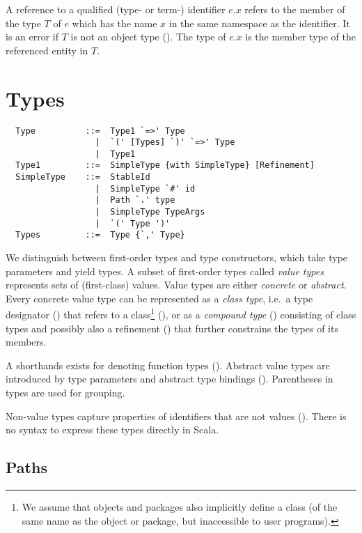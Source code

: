 \documentclass[a4paper,12pt,twoside,titlepage]{book}
\begin{document}
A reference to a qualified (type- or term-) identifier $e.x$ refers to
the member of the type $T$ of $e$ which has the name $x$ in the same
namespace as the identifier. It is an error if $T$ is not an object type
(). The type of $e.x$ is the member type of the
referenced entity in $T$.

\chapter{\label{sec:types}Types}

\syntax\begin{lstlisting}
  Type          ::=  Type1 `=>' Type
                  |  `(' [Types] `)' `=>' Type
                  |  Type1
  Type1         ::=  SimpleType {with SimpleType} [Refinement]
  SimpleType    ::=  StableId
                  |  SimpleType `#' id
                  |  Path `.' type
                  |  SimpleType TypeArgs
                  |  `(' Type ')'
  Types         ::=  Type {`,' Type}
\end{lstlisting}

We distinguish between first-order types and type constructors, which
take type parameters and yield types. A subset of first-order types
called {\em value types} represents sets of (first-class) values.
Value types are either {\em concrete} or {\em abstract}. Every
concrete value type can be represented as a {\em class type}, i.e.\ a
type designator () that refers to a 
class\footnote{We assume that objects and packages also
implicitly define a class (of the same name as the object or package,
but inaccessible to user programs).} (), 
or as a {\em compound type} () 
consisting of class types and possibly
also a refinement () that further constrains the
types of its members.

A shorthands exists for denoting function types
().  Abstract value types are introduced by
type parameters and abstract type bindings ().
Parentheses in types are used for grouping.

Non-value types capture properties of
identifiers that are not values
().  There is no syntax to express these
types directly in Scala.

\section{Paths}\label{sec:paths}
\end{document}
